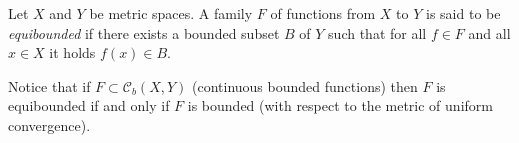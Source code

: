 \documentclass[12pt]{article}
\begin{document}
Let $X$ and $Y$ be metric spaces. A family $F$ of functions from $X$ to $Y$ is said to be \emph{equibounded} if there exists a bounded subset $B$ of $Y$ such that for all $f\in F$ and all $x\in X$ it holds $f(x)\in B$. 

Notice that if $F\subset \mathcal C_b(X,Y)$ (continuous bounded functions) then $F$ is equibounded if and only if $F$ is bounded (with respect to the metric of uniform convergence).
\end{document}
